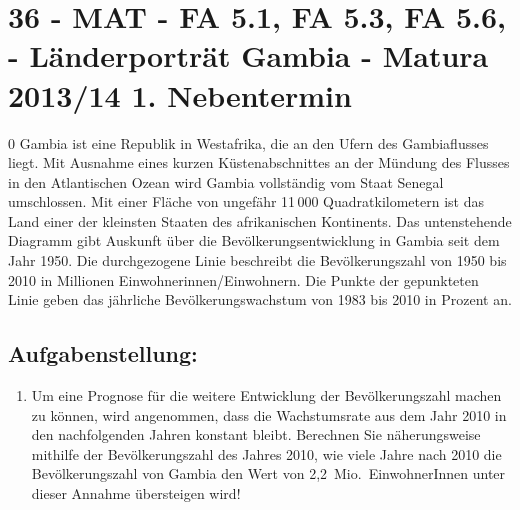 \section{36 - MAT - FA 5.1, FA 5.3, FA 5.6,  - Länderporträt Gambia - Matura 2013/14 1. Nebentermin}

\begin{langesbeispiel} \item[0] %
				Gambia ist eine Republik in Westafrika, die an den Ufern des Gambiaflusses liegt. Mit Ausnahme eines kurzen Küstenabschnittes an der Mündung des Flusses in den Atlantischen Ozean wird Gambia vollständig vom Staat Senegal umschlossen. Mit einer Fläche von ungefähr 11\,000  Quadratkilometern ist das Land einer der kleinsten Staaten des afrikanischen Kontinents. Das untenstehende Diagramm gibt Auskunft über die Bevölkerungsentwicklung in Gambia seit dem Jahr 1950. Die durchgezogene Linie beschreibt die Bevölkerungszahl von 1950 bis 2010 in Millionen Einwohnerinnen/Einwohnern. Die Punkte der gepunkteten Linie geben das jährliche Bevölkerungswachstum von 1983 bis 2010 in Prozent an.
				

				
\subsection{Aufgabenstellung:}
\begin{enumerate}
	\item Um eine Prognose für die weitere Entwicklung der Bevölkerungszahl machen zu können, wird angenommen, dass die Wachstumsrate aus dem Jahr 2010 in den nachfolgenden Jahren konstant bleibt. Berechnen Sie näherungsweise mithilfe der Bevölkerungszahl des Jahres 2010, wie viele Jahre nach 2010 die Bevölkerungszahl von Gambia den Wert von 2,2 Mio. EinwohnerInnen unter dieser Annahme übersteigen wird!
	

\end{enumerate}
\end{langesbeispiel}
